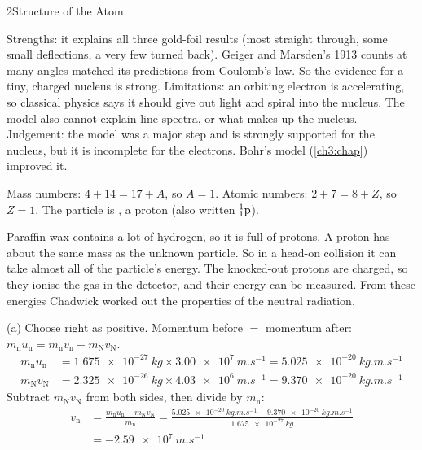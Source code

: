 \begin{chapteranswers}{2}{Structure of the Atom}
  \item Strengths: it explains all three gold-foil results (most straight
        through, some small deflections, a very few turned back). Geiger and
        Marsden's 1913 counts at many angles matched its predictions from
        Coulomb's law. So the evidence for a tiny, charged nucleus is strong.
        Limitations: an orbiting electron is accelerating, so classical physics
        says it should give out light and spiral into the nucleus. The model
        also cannot explain line spectra, or what makes up the nucleus.
        Judgement: the model was a major step and is strongly supported for the
        nucleus, but it is incomplete for the electrons. Bohr's model
        (\cref{ch3:chap}) improved it.
  \item Mass numbers: $4 + 14 = 17 + A$, so $A = 1$. Atomic numbers:
        $2 + 7 = 8 + Z$, so $Z = 1$. The particle is ,
        a proton (also written $\chTwoNuc{1}{1}{p}$).
  \item Paraffin wax contains a lot of hydrogen, so it is full of protons.
        A proton has about the same mass as the unknown particle. So in a
        head-on collision it can take almost all of the particle's energy. The
        knocked-out protons are charged, so they ionise the gas in the detector,
        and their energy can be measured. From these energies Chadwick worked
        out the properties of the neutral radiation.
  \item (a) Choose right as positive. Momentum before $=$ momentum after:
        $m_\mathrm{n}u_\mathrm{n} = m_\mathrm{n}v_\mathrm{n} + m_\mathrm{N}v_\mathrm{N}$.
        \begin{align*}
          m_\mathrm{n}u_\mathrm{n} &= \qty{1.675e-27}{kg}\times\qty{3.00e7}{m.s^{-1}}
            = \qty{5.025e-20}{kg.m.s^{-1}}\\
          m_\mathrm{N}v_\mathrm{N} &= \qty{2.325e-26}{kg}\times\qty{4.03e6}{m.s^{-1}}
            = \qty{9.370e-20}{kg.m.s^{-1}}
        \end{align*}
        Subtract $m_\mathrm{N}v_\mathrm{N}$ from both sides, then divide by $m_\mathrm{n}$:
        \begin{align*}
          v_\mathrm{n} &= \frac{m_\mathrm{n}u_\mathrm{n} - m_\mathrm{N}v_\mathrm{N}}{m_\mathrm{n}}
          = \frac{\qty{5.025e-20}{kg.m.s^{-1}} - \qty{9.370e-20}{kg.m.s^{-1}}}{\qty{1.675e-27}{kg}}\\
          &= -\qty{2.59e7}{m.s^{-1}}
        \end{align*}

\end{chapteranswers}
